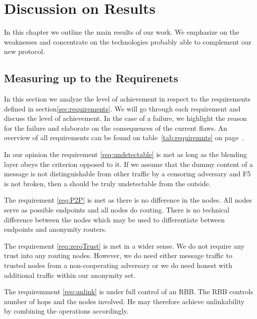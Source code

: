 \part{Discussion on Results}
In this chapter we outline the main results of our work. We emphasize on the weaknesses and concentrate on the technologies probably able to complement our new protocol.

\chapter{Measuring up to the Requirenets\label{sec:reqDiscussion}}
In this section we analyze the level of achievement in respect to the requirements defined in section\ref{sec:requirements}. We will go through each requirement and discuss the level of achievement. In the case of a failure, we highlight the reason for the failure and elaborate on the consequences of the current flaws. An overview of all requirements can be found on table~\ref{tab:requiremnts} on page~\pageref{tab:requiremnts}.

In our opinion the requirement \ref{req:undetectable} is met as long as the blending layer obeys the criterion opposed to it. If we assume that the dummy content of a message is not distinguishable from other traffic by a censoring adversary and F5 is not broken, then a \VortexNode{} should be truly undetectable from the outside.

The requirement \ref{req:P2P} is met as there is no difference in the nodes. All nodes serve as possible endpoints and all nodes do routing. There is no technical difference between the nodes which may be used to differentiate between endpoints and anonymity routers.

The requirement \ref{req:zeroTrust} is met in a wider sense. We do not require any trust into any routing nodes. However, we do need either message traffic to trusted nodes from a non-cooperating adversary or we do need honest \VortexNodes{} with additional traffic within our anonymity set. 

The requiremment \ref{req:unlink} is under full control of an RBB. The RBB controls number of hops and the nodes involved. He may therefore achieve unlinkability by combining the operations accordingly.


